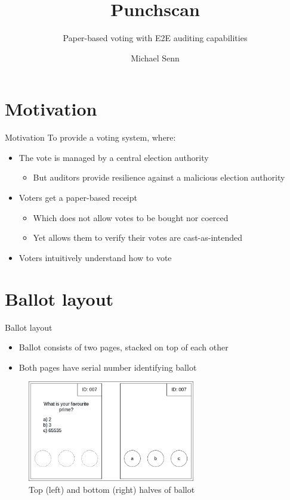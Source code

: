 \documentclass{beamer}
\title{Punchscan}
\subtitle{Paper-based voting with E2E auditing capabilities}
\author{Michael Senn}
\institute{Faculty of Science, University of Bern}
\date{\DTMusedate{presentation}}
\begin{document}
\maketitle

\section{Motivation}

\begin{frame}{Motivation}
	To provide a voting system, where:
	\begin{itemize}
		\item The vote is managed by a central election authority
			\begin{itemize}
				\item But auditors provide resilience against a malicious election authority
			\end{itemize}
		\item Voters get a paper-based receipt
			\begin{itemize}
				\item Which does not allow votes to be bought nor coerced
				\item Yet allows them to verify their votes are cast-as-intended
			\end{itemize}
		\item Voters intuitively understand how to vote
	\end{itemize}
\end{frame}

\section{Ballot layout}

\begin{frame}{Ballot layout}
	\begin{itemize}
		\item Ballot consists of two pages, stacked on top of each other
		\item Both pages have serial number identifying ballot
	\end{itemize}
	\begin{figure}
		\centering
		\includegraphics[width=0.65\textwidth]{../resources/high_level_ballot.drawio.png}
		\caption{Top (left) and bottom (right) halves of ballot}
	\end{figure}
\end{frame}
\end{document}
